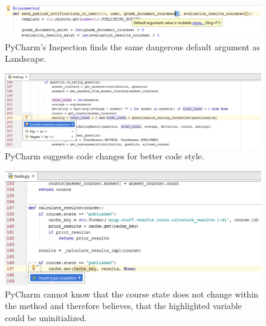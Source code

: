 \begin{figure}[h!]
	\centering
	\includegraphics[width=.8\textwidth, keepaspectratio]{graphics/pyCharmInspection-defaultArgumentValueIsMutable}
	\caption{PyCharm's Inspection finds the same dangerous default argument as Landscape.}
\end{figure}

\begin{figure}[h!]
	\centering
	\includegraphics[width=.8\textwidth, keepaspectratio]{graphics/pyCharmInspection-simplifyChainedComparison}
	\caption{PyCharm suggests code changes for better code style.}
\end{figure}

\begin{figure}[h!]
	\centering
	\includegraphics[width=.8\textwidth, keepaspectratio]{graphics/pyCharmInspection-unboundLocalVariable}
	\caption{PyCharm cannot know that the course state does not change within the method and therefore believes, that the highlighted variable could be uninitialized.}
	\label{pic:pycharm-uninitialized}
\end{figure}
